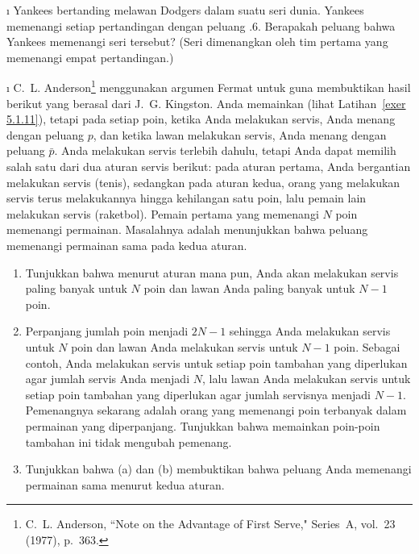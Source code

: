 \begin{LJSItem}
\i\label{exer 5.1.14} Yankees bertanding melawan Dodgers dalam suatu seri dunia.  Yankees memenangi
setiap pertandingan dengan peluang .6.  Berapakah peluang bahwa Yankees memenangi seri tersebut?  (Seri
dimenangkan oleh tim pertama yang memenangi empat pertandingan.)

\i\label{exer 5.1.15} C.~L. Anderson\footnote{C.~L. Anderson, ``Note on the
Advantage of First Serve,"  Series~A, vol.~23 (1977),
p.~363.} menggunakan argumen Fermat untuk  guna membuktikan hasil berikut
yang berasal dari J.~G. Kingston.  Anda memainkan  (lihat
Latihan~\ref{exer 5.1.11}), tetapi pada setiap poin, ketika Anda melakukan servis, Anda menang dengan peluang $p$, dan
ketika lawan melakukan servis, Anda menang dengan peluang $\bar{p}$.  Anda melakukan servis terlebih dahulu, tetapi Anda
dapat memilih salah satu dari dua aturan servis berikut: pada aturan pertama, Anda
bergantian melakukan servis (tenis), sedangkan pada aturan kedua, orang yang melakukan servis terus melakukannya
hingga kehilangan satu poin, lalu pemain lain melakukan servis (raketbol).  Pemain
pertama yang memenangi $N$ poin memenangi permainan.  Masalahnya adalah menunjukkan bahwa peluang
memenangi permainan sama pada kedua aturan.
\begin{enumerate}

\item Tunjukkan bahwa menurut aturan mana pun, Anda akan melakukan servis paling banyak untuk $N$ poin dan lawan Anda
paling banyak untuk $N - 1$ poin.

\item Perpanjang jumlah poin menjadi $2N - 1$ sehingga Anda melakukan servis untuk $N$ poin dan lawan Anda
melakukan servis untuk $N - 1$ poin.  Sebagai contoh, Anda melakukan servis untuk setiap poin tambahan yang diperlukan agar jumlah servis Anda menjadi $N$, lalu
lawan Anda melakukan servis untuk setiap poin tambahan yang diperlukan agar jumlah servisnya menjadi $N - 1$. 
Pemenangnya sekarang adalah orang yang memenangi poin terbanyak dalam permainan yang diperpanjang.  Tunjukkan bahwa
memainkan poin-poin tambahan ini tidak mengubah pemenang.

\item Tunjukkan bahwa (a) dan (b) membuktikan bahwa peluang Anda memenangi permainan sama menurut
kedua aturan.
\end{enumerate}


\end{LJSItem}
